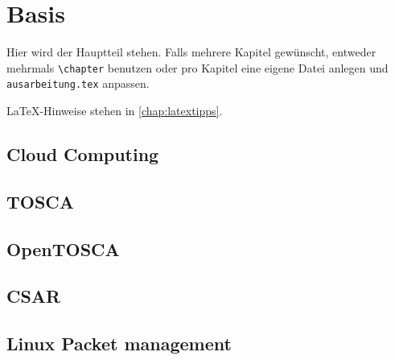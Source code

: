 
\chapter{Basis}
\label{chap:basis}

Hier wird der Hauptteil stehen. Falls mehrere Kapitel gewünscht, entweder mehrmals \texttt{\textbackslash{}chapter} benutzen oder pro Kapitel eine eigene Datei anlegen und \texttt{ausarbeitung.tex} anpassen.

LaTeX-Hinweise stehen in \cref{chap:latextipps}.

\section{Cloud Computing}
\section{TOSCA}
\section{OpenTOSCA}
\section{CSAR}
\section{Linux Packet management}



